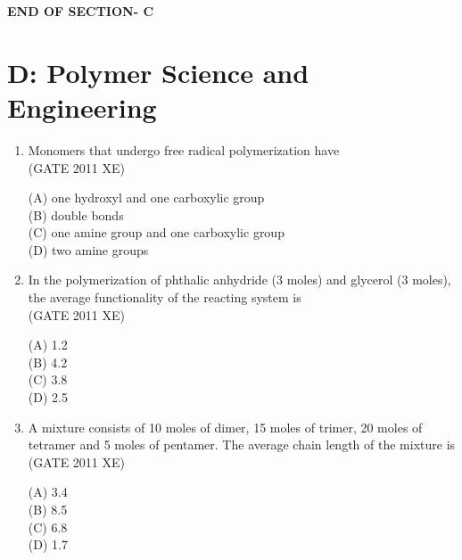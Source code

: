\documentclass[journal,12pt,onecolumn]{IEEEtran}
\begin{document}
\vspace{3\baselineskip}
    \begin{center}
    \textbf{\Large END OF SECTION- C}
    \end{center}

\newpage

\section*{D: Polymer Science and Engineering}
\vspace{1cm}
\begin{enumerate}[label=\arabic*)]

\item Monomers that undergo free radical polymerization have\\

\hfill{(GATE 2011 XE)} \\
\begin{multicols}{2}
(A) one hydroxyl and one carboxylic group\\
(B) double bonds\\
(C) one amine group and one carboxylic group\\
(D) two amine groups
\end{multicols}

\item In the polymerization of phthalic anhydride (3 moles) and glycerol (3 moles), the average functionality of the reacting system is\\

\hfill{(GATE 2011 XE)} \\
\begin{multicols}{4}
(A) 1.2\\
(B) 4.2\\
(C) 3.8\\
(D) 2.5
\end{multicols}

\item A mixture consists of 10 moles of dimer, 15 moles of trimer, 20 moles of tetramer and 5 moles of pentamer. The average chain length of the mixture is\\

\hfill{(GATE 2011 XE)} \\
\begin{multicols}{4}
(A) 3.4\\
(B) 8.5\\
(C) 6.8\\
(D) 1.7
\end{multicols}



\end{enumerate}
\end{document}

